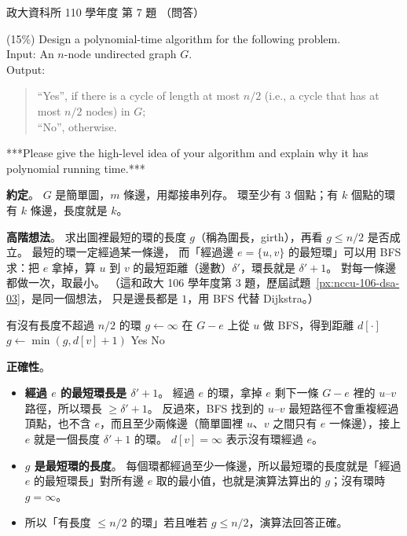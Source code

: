 \begin{pastexam}[label={px:nccu-110-dsa-07}]{政大資科所 110 學年度 第 7 題}
（問答）

(15\%) Design a polynomial-time algorithm for the following problem.\\
Input: An $n$-node undirected graph $G$.\\
Output:
\begin{quote}
``Yes'', if there is a cycle of length at most $n/2$ (i.e., a cycle that has at most $n/2$ nodes) in
$G$;\\
``No'', otherwise.
\end{quote}
***Please give the high-level idea of your algorithm and explain why it has polynomial running time.***
\end{pastexam}

\begin{pastsoln}
\textbf{約定}。 $G$ 是簡單圖，$m$ 條邊，用鄰接串列存。 環至少有 $3$ 個點；有 $k$ 個點的環有 $k$ 條邊，長度就是 $k$。

\textbf{高階想法}。 求出圖裡最短的環的長度 $g$（稱為圍長，girth），再看 $g \le n/2$ 是否成立。 最短的環一定經過某一條邊，
而「經過邊 $e = \{u, v\}$ 的最短環」可以用 BFS 求：把 $e$ 拿掉，算 $u$ 到 $v$ 的最短距離（邊數）$\delta'$，環長就是
$\delta' + 1$。 對每一條邊都做一次，取最小。 （這和政大 106 學年度第 3 題，歷屆試題~\ref{px:nccu-106-dsa-03}，是同一個想法，
只是邊長都是 $1$，用 BFS 代替 Dijkstra。）

\begin{pseudo}{有沒有長度不超過 $n/2$ 的環}
    \State $g \gets \infty$
        \State 在 $G - e$ 上從 $u$ 做 BFS，得到距離 $d[\cdot]$ 
            \State $g \gets \min(g, d[v] + 1)$ 
        \EndIf
    \EndFor
        \State \Return Yes
    \Else
        \State \Return No
    \EndIf
\EndFunction
\end{pseudo}

\textbf{正確性}。
\begin{itemize}
\item \textbf{經過 $e$ 的最短環長是 $\delta' + 1$}。 經過 $e$ 的環，拿掉 $e$ 剩下一條 $G - e$ 裡的 $u$--$v$ 路徑，所以環長
$\ge \delta' + 1$。 反過來，BFS 找到的 $u$--$v$ 最短路徑不會重複經過頂點，也不含 $e$，而且至少兩條邊（簡單圖裡 $u$、$v$
之間只有 $e$ 一條邊），接上 $e$ 就是一個長度 $\delta' + 1$ 的環。 $d[v] = \infty$ 表示沒有環經過 $e$。
\item \textbf{$g$ 是最短環的長度}。 每個環都經過至少一條邊，所以最短環的長度就是「經過 $e$ 的最短環長」對所有邊 $e$
取的最小值，也就是演算法算出的 $g$；沒有環時 $g = \infty$。
\item 所以「有長度 $\le n/2$ 的環」若且唯若 $g \le n/2$，演算法回答正確。
\end{itemize}


\end{pastsoln}
